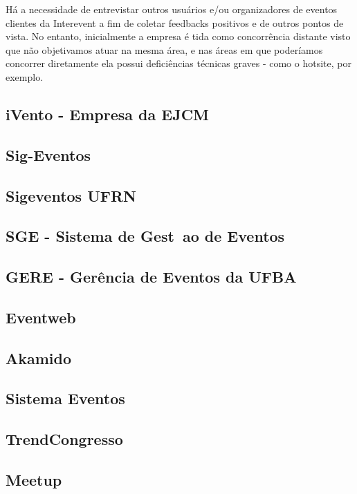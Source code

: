 \documentclass[12pt,a4paper,twoside,hyphens,english,brazil]{abntex2}
\begin{document}
Há a necessidade de entrevistar outros usuários e/ou organizadores de eventos clientes da Interevent a fim de coletar feedbacks positivos e de outros pontos de vista. No entanto, inicialmente a empresa é tida como concorrência distante visto que não objetivamos atuar na mesma área, e nas áreas em que poderíamos concorrer diretamente ela possui deficiências técnicas graves - como o hotsite, por exemplo.


\subsection{iVento - Empresa da EJCM}
\subsection{Sig-Eventos}
\subsection{Sigeventos UFRN}
\subsection{SGE - Sistema de Gest~ao de Eventos}
\subsection{GERE - Gerência de Eventos da UFBA}
\subsection{Eventweb}
\subsection{Akamido}
\subsection{Sistema Eventos}
\subsection{TrendCongresso}
\subsection{Meetup}
\end{document}
